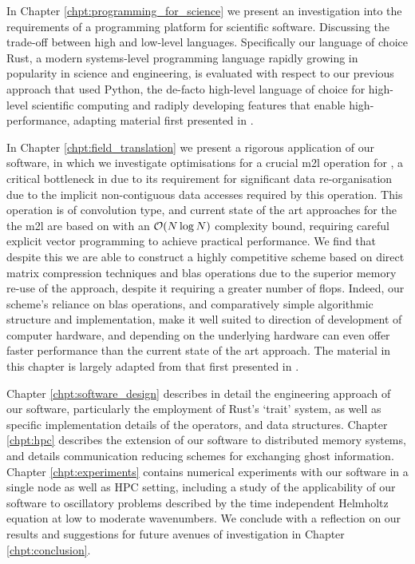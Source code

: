In Chapter \ref{chpt:programming_for_science} we present an investigation into the requirements of a programming platform for scientific software. Discussing the trade-off between high and low-level languages. Specifically our language of choice Rust, a modern systems-level programming language rapidly growing in popularity in science and engineering, is evaluated with respect to our previous approach that used Python, the de-facto high-level language of choice for high-level scientific computing and radiply developing features that enable high-performance, adapting material first presented in \cite{kailasa2022pyexafmm}.

In Chapter \ref{chpt:field_translation} we present a rigorous application of our software, in which we investigate optimisations for a crucial \acrfull{m2l} operation for , a critical bottleneck in  due to its requirement for significant data re-organisation due to the implicit non-contiguous data accesses required by this operation. This operation is of convolution type, and current state of the art approaches for the the \acrshort{m2l} are based on  with an $\mathcal{O}(N \log{N})$ complexity bound, requiring careful explicit vector programming to achieve practical performance. We find that despite this we are able to construct a highly competitive scheme based on direct matrix compression techniques and \acrfull{blas} operations due to the superior memory re-use of the approach, despite it requiring a greater number of \glspl{flop}. Indeed, our scheme's reliance on \acrshort{blas} operations, and comparatively simple algorithmic structure and implementation, make it well suited to direction of development of computer hardware, and depending on the underlying hardware can even offer faster performance than the current state of the art approach. The material in this chapter is largely adapted from that first presented in \cite{kailasa2024m2ltranslationoperatorskernel}.

Chapter \ref{chpt:software_design} describes in detail the engineering approach of our software, particularly the employment of Rust's `trait' system, as well as specific implementation details of the  operators, and data structures. Chapter \ref{chpt:hpc} describes the extension of our software to distributed memory systems, and details communication reducing schemes for exchanging ghost information. Chapter \ref{chpt:experiments} contains numerical experiments with our software in a single node as well as HPC setting, including a study of the applicability of our software to oscillatory problems described by the time independent Helmholtz equation at low to moderate wavenumbers. We conclude with a reflection on our results and suggestions for future avenues of investigation in Chapter \ref{chpt:conclusion}.



